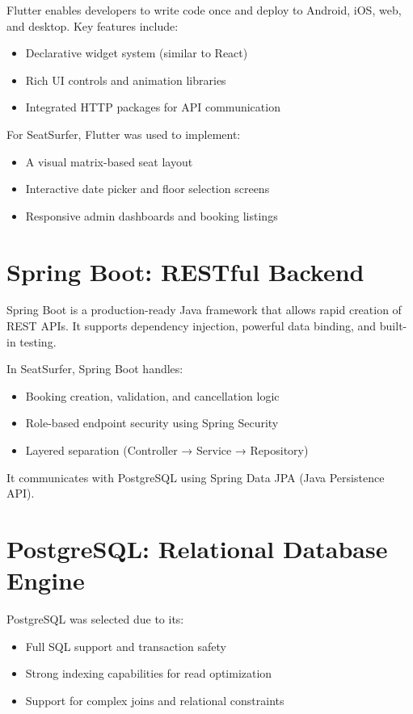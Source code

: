 \documentclass[12pt,a4paper]{report}
\begin{document}
Flutter enables developers to write code once and deploy to Android, iOS, web, and desktop. Key features include:
\begin{itemize}
    \item Declarative widget system (similar to React)
    \item Rich UI controls and animation libraries
    \item Integrated HTTP packages for API communication
\end{itemize}

For SeatSurfer, Flutter was used to implement:
\begin{itemize}
    \item A visual matrix-based seat layout
    \item Interactive date picker and floor selection screens
    \item Responsive admin dashboards and booking listings
\end{itemize}

\section{Spring Boot: RESTful Backend}

Spring Boot is a production-ready Java framework that allows rapid creation of REST APIs. It supports dependency injection, powerful data binding, and built-in testing.

In SeatSurfer, Spring Boot handles:
\begin{itemize}
    \item Booking creation, validation, and cancellation logic
    \item Role-based endpoint security using Spring Security
    \item Layered separation (Controller → Service → Repository)
\end{itemize}

It communicates with PostgreSQL using Spring Data JPA (Java Persistence API).

\section{PostgreSQL: Relational Database Engine}

PostgreSQL was selected due to its:
\begin{itemize}
    \item Full SQL support and transaction safety
    \item Strong indexing capabilities for read optimization
    \item Support for complex joins and relational constraints
\end{itemize}
\end{document}
